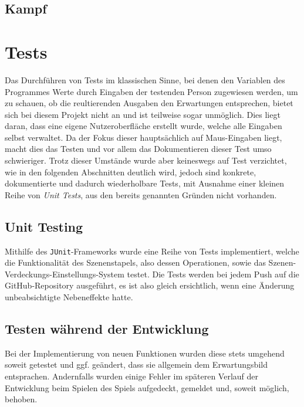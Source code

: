 \subsection{Kampf}


\section{Tests}

Das Durchführen von Tests im klassischen Sinne, bei denen den Variablen des Programmes Werte durch Eingaben der testenden Person zugewiesen werden, um zu schauen, ob die reultierenden Ausgaben den Erwartungen entsprechen, bietet sich bei diesem Projekt nicht an und ist teilweise sogar unmöglich.
Dies liegt daran, dass eine eigene Nutzeroberfläche erstellt wurde, welche alle Eingaben selbst verwaltet.
Da der Fokus dieser hauptsächlich auf Maus-Eingaben liegt, macht dies das Testen und vor allem das Dokumentieren dieser Test umso schwieriger.
Trotz dieser Umstände wurde aber keineswegs auf Test verzichtet, wie in den folgenden Abschnitten deutlich wird, jedoch sind konkrete, dokumentierte und dadurch wiederholbare Tests, mit Ausnahme einer kleinen Reihe von \textit{Unit Tests}, aus den bereits genannten Gründen nicht vorhanden.

\subsection{Unit Testing}

Mithilfe des \texttt{JUnit}-Frameworks wurde eine Reihe von Tests implementiert,
welche die Funktionalität des Szenenstapels, also dessen Operationen, sowie das
Szenen-Verdeckungs-Einstellungs-System testet. Die Tests werden bei jedem Push
auf die GitHub-Repository ausgeführt, es ist also gleich ersichtlich, wenn eine
Änderung unbeabsichtigte Nebeneffekte hatte.

\subsection{Testen während der Entwicklung}

Bei der Implementierung von neuen Funktionen wurden diese stets umgehend soweit
getestet und ggf. geändert, dass sie allgemein dem Erwartungsbild entsprachen.
Andernfalls wurden einige Fehler im späteren Verlauf der Entwicklung beim Spielen
des Spiels aufgedeckt, gemeldet und, soweit möglich, behoben.
